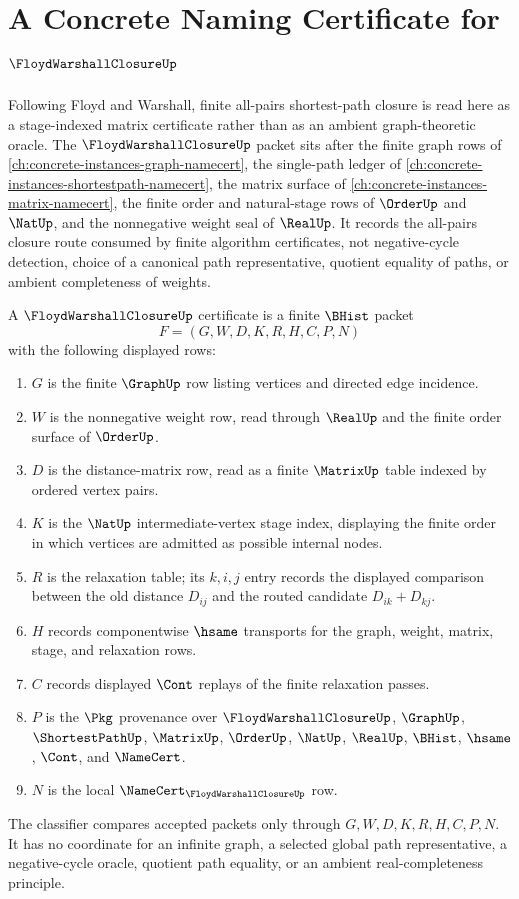 \chapter{A Concrete Naming Certificate for $\FloydWarshallClosureUp$}
\label{ch:concrete-instances-floyd-warshall-closure-namecert}

Following Floyd and Warshall, finite all-pairs shortest-path closure is read here as a stage-indexed matrix certificate rather than as an ambient graph-theoretic oracle. The $\FloydWarshallClosureUp$ packet sits after the finite graph rows of \autoref{ch:concrete-instances-graph-namecert}, the single-path ledger of \autoref{ch:concrete-instances-shortestpath-namecert}, the matrix surface of \autoref{ch:concrete-instances-matrix-namecert}, the finite order and natural-stage rows of $\OrderUp$ and $\NatUp$, and the nonnegative weight seal of $\RealUp$. It records the all-pairs closure route consumed by finite algorithm certificates, not negative-cycle detection, choice of a canonical path representative, quotient equality of paths, or ambient completeness of weights.

\begin{definition}
\label{def:floyd-warshall-closure-certificate}
A $\FloydWarshallClosureUp$ certificate is a finite $\BHist$ packet
$$
F=(G,W,D,K,R,H,C,P,N)
$$
with the following displayed rows:
\begin{enumerate}
\item $G$ is the finite $\GraphUp$ row listing vertices and directed edge incidence.
\item $W$ is the nonnegative weight row, read through $\RealUp$ and the finite order surface of $\OrderUp$.
\item $D$ is the distance-matrix row, read as a finite $\MatrixUp$ table indexed by ordered vertex pairs.
\item $K$ is the $\NatUp$ intermediate-vertex stage index, displaying the finite order in which vertices are admitted as possible internal nodes.
\item $R$ is the relaxation table; its $k,i,j$ entry records the displayed comparison between the old distance $D_{ij}$ and the routed candidate $D_{ik}+D_{kj}$.
\item $H$ records componentwise $\hsame$ transports for the graph, weight, matrix, stage, and relaxation rows.
\item $C$ records displayed $\Cont$ replays of the finite relaxation passes.
\item $P$ is the $\Pkg$ provenance over $\FloydWarshallClosureUp$, $\GraphUp$, $\ShortestPathUp$, $\MatrixUp$, $\OrderUp$, $\NatUp$, $\RealUp$, $\BHist$, $\hsame$, $\Cont$, and $\NameCert$.
\item $N$ is the local $\NameCert_{\FloydWarshallClosureUp}$ row.
\end{enumerate}
The classifier compares accepted packets only through $G,W,D,K,R,H,C,P,N$. It has no coordinate for an infinite graph, a selected global path representative, a negative-cycle oracle, quotient path equality, or an ambient real-completeness principle.
\end{definition}

